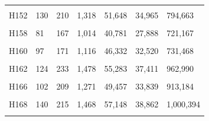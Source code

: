 \documentclass[
  a4paper,
  titlepage]{article}
\begin{document}
\begin{longtable}[t]{lllllll}
\cellcolor{gray!6}{H151} & \cellcolor{gray!6}{140} & \cellcolor{gray!6}{260} & \cellcolor{gray!6}{1,602} & \cellcolor{gray!6}{63,572} & \cellcolor{gray!6}{42,977} & \cellcolor{gray!6}{1,136,457}\\
 
H152 & 130 & 210 & 1,318 & 51,648 & 34,965 & 794,663\\
 
\cellcolor{gray!6}{H157} & \cellcolor{gray!6}{85} & \cellcolor{gray!6}{180} & \cellcolor{gray!6}{1,121} & \cellcolor{gray!6}{45,708} & \cellcolor{gray!6}{31,238} & \cellcolor{gray!6}{850,228}\\
 
H158 & 81 & 167 & 1,014 & 40,781 & 27,888 & 721,167\\
 
\cellcolor{gray!6}{H159} & \cellcolor{gray!6}{117} & \cellcolor{gray!6}{214} & \cellcolor{gray!6}{1,482} & \cellcolor{gray!6}{56,224} & \cellcolor{gray!6}{37,952} & \cellcolor{gray!6}{919,363}\\
 
H160 & 97 & 171 & 1,116 & 46,332 & 32,520 & 731,468\\
 
\cellcolor{gray!6}{H161} & \cellcolor{gray!6}{78} & \cellcolor{gray!6}{208} & \cellcolor{gray!6}{1,147} & \cellcolor{gray!6}{48,298} & \cellcolor{gray!6}{33,962} & \cellcolor{gray!6}{873,765}\\
 
H162 & 124 & 233 & 1,478 & 55,283 & 37,411 & 962,990\\
 
\cellcolor{gray!6}{H164} & \cellcolor{gray!6}{149} & \cellcolor{gray!6}{283} & \cellcolor{gray!6}{1,850} & \cellcolor{gray!6}{71,758} & \cellcolor{gray!6}{48,228} & \cellcolor{gray!6}{1,223,218}\\
 
H166 & 102 & 209 & 1,271 & 49,457 & 33,839 & 913,184\\
 
\cellcolor{gray!6}{H167} & \cellcolor{gray!6}{104} & \cellcolor{gray!6}{197} & \cellcolor{gray!6}{1,230} & \cellcolor{gray!6}{49,001} & \cellcolor{gray!6}{34,146} & \cellcolor{gray!6}{781,487}\\
 
H168 & 140 & 215 & 1,468 & 57,148 & 38,862 & 1,000,394\\
 
\cellcolor{gray!6}{H169} & \cellcolor{gray!6}{102} & \cellcolor{gray!6}{189} & \cellcolor{gray!6}{1,223} & \cellcolor{gray!6}{49,172} & \cellcolor{gray!6}{33,952} & \cellcolor{gray!6}{869,262}\\
 

\end{longtable}
\end{document}
